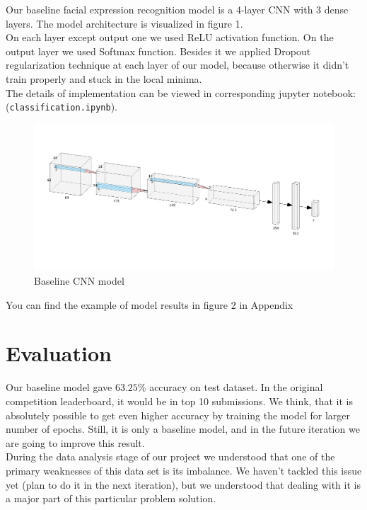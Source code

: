 Our baseline facial expression recognition model is a 4-layer CNN with 3 dense layers. The model architecture is visualized in figure 1.\\

On each layer except output one we used ReLU activation function. On the output layer we used Softmax function. Besides it we applied Dropout regularization technique at each layer of our model, because otherwise it didn't train properly and stuck in the local minima. \\

The details of implementation can be viewed in corresponding jupyter notebook: (\texttt{classification.ipynb}).\\

\begin{figure}
	\centering
	\includegraphics[width=\textwidth]{../images/baseline-architecture.png}
	\caption{Baseline CNN model}
\end{figure}

You can find the example of model results in figure 2 in Appendix

\section{Evaluation}

Our baseline model gave $63.25\%$ accuracy on test dataset. In the original competition leaderboard, it would be in top 10 submissions. We think, that it is absolutely possible to get even higher accuracy by training the model for larger number of epochs. Still, it is only a baseline model, and in the future iteration we are going to improve this result.\\ 

During the data analysis stage of our project we understood that one of the primary weaknesses of this data set is its imbalance. We haven't tackled this issue yet (plan to do it in the next iteration), but we understood that dealing with it is a major part of this particular problem solution.\\

